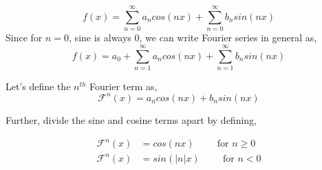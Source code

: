\begin{equation}
    f(x) = \sum_{n=0}^{\infty} a_n cos(nx) + \sum_{n=0}^{\infty} b_n sin(nx)
\end{equation}
Since for $n=$0, sine is always 0, we can write Fourier series in general as,
\begin{equation}
    f(x) = a_0 + \sum_{n=1}^{\infty} a_n cos(nx) + \sum_{n=1}^{\infty} b_n sin(nx)
\end{equation}

Let's define the $n^{th}$ Fourier term as,
\begin{equation}
    \mathcal{F}^n(x) = a_n cos(nx) + b_n sin(nx)
\end{equation}

Further, divide the sine and cosine terms apart by defining,

\begin{align}
    \mathcal{F}^n(x) &= cos(nx) \hspace{1cm}\text{for } n\geq 0 \label{fourier-basis-cos}\\[.3cm]
    \mathcal{F}^n(x) &= sin(|n|x) \hspace{1cm}\text{for } n < 0
    \label{fourier-basis-sin}
\end{align}
